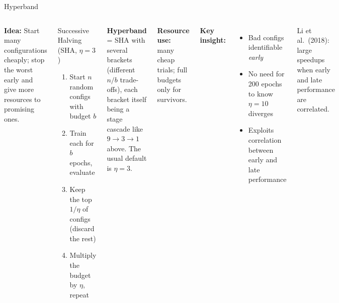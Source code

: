 \documentclass[aspectratio=169,11pt]{beamer}
\newcommand{\emphc}[1]{\textcolor{harvardcrimson}{#1}}
\begin{document}
\begin{frame}{Hyperband}
\footnotesize
\begin{columns}[T]
\textbf{Idea:} Start many configurations cheaply; \emphc{stop the worst early} and give more resources to promising ones.

\vspace{0.05cm}
\begin{block}{Successive Halving (SHA, $\eta=3$)}
\begin{enumerate}\itemsep0pt
    \item Start $n$ random configs with budget $b$
    \item Train each for $b$ epochs, evaluate
    \item \emphc{Keep the top $1/\eta$} of configs (discard the rest)
    \item Multiply the budget by $\eta$, repeat
\end{enumerate}
\end{block}

\textbf{Hyperband} = SHA with several brackets (different $n/b$ trade-offs), each bracket itself being a stage cascade like $9 \to 3 \to 1$ above.  The usual default is $\eta=3$.

\textbf{Resource use:} many cheap trials; full budgets only for survivors.

\textbf{Key insight:}
\begin{itemize}\itemsep0pt
    \item Bad configs identifiable \emph{early}
    \item No need for 200 epochs to know $\eta\!=\!10$ diverges
    \item Exploits \emphc{correlation} between early and late performance
\end{itemize}

{\scriptsize Li et al.\ (2018): large speedups when early and late performance are correlated.}
\end{columns}
\end{frame}
\end{document}
